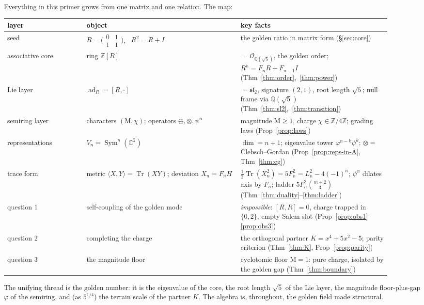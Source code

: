 \documentclass[11pt]{article}
\newcommand{\OK}{𝒪}
\theoremstyle{plain}
\theoremstyle{definition}
\theoremstyle{remark}
\newcommand{\Tr}{\operatorname{Tr}}
\newcommand{\Mah}{\mathrm{M}}
\newcommand{\ad}{\operatorname{ad}}
\begin{document}
Everything in this primer grows from one matrix and one relation. The map:
\begin{center}\small
\renewcommand{\arraystretch}{1.35}
\begin{tabular}{@{}p{0.19\linewidth}p{0.37\linewidth}p{0.36\linewidth}@{}}
\toprule
layer & object & key facts \\
\midrule
seed & $R=\bigl(\begin{smallmatrix}0&1\\1&1\end{smallmatrix}\bigr)$, \ $R^{2}=R+I$ & the golden ratio in matrix form (§\ref{sec:core}) \\
associative core & ring $ℤ[R]$ & $=\OK_{ℚ(\sqrt5)}$, the golden order; $R^{n}=F_nR+F_{n-1}I$ (Thm~\ref{thm:order},~\ref{thm:power}) \\
Lie layer & $\ad_R=[R,\cdot]$ & $=𝔰𝔩_2$, signature $(2,1)$, root length $\sqrt5$; null frame via $ℚ(\sqrt5)$ (Thm~\ref{thm:sl2},~\ref{thm:transition}) \\
semiring layer & characters $(\Mah,χ)$; operators $⊕,⊗,ψ^{n}$ & magnitude $\Mah≥1$, charge $χ∈ℤ/4ℤ$; grading laws (Prop~\ref{prop:laws}) \\
representations & $V_n=\operatorname{Sym}^n(ℂ^2)$ & $\dim=n+1$; eigenvalue tower $φ^{n-k}ψ^k$; $⊗=$ Clebsch--Gordan (Prop~\ref{prop:reps-in-A}, Thm~\ref{thm:cg}) \\
trace form & metric $⟨X,Y⟩=\Tr(XY)$; deviation $X_n=F_nH$ & $\tfrac12\Tr(X_n^{2})=5F_n^{2}=L_n^{2}-4(-1)^{n}$; $ψ^{n}$ dilates axis by $F_n$; ladder $5F_n^{2}\binom{m+2}{3}$ (Thm~\ref{thm:duality}--\ref{thm:ladder}) \\
\midrule
question 1 & self-coupling of the golden mode & \emph{impossible}: $[R,R]=0$, charge trapped in $\{0,2\}$, empty Salem slot (Prop~\ref{prop:obs1}--\ref{prop:obs3}) \\
question 2 & completing the charge & the orthogonal partner $K=x^4+5x^2-5$; parity criterion (Thm~\ref{thm:K}, Prop~\ref{prop:parity}) \\
question 3 & the magnitude floor & cyclotomic floor $\Mah=1$: pure charge, isolated by the golden gap (Thm~\ref{thm:boundary}) \\
\bottomrule
\end{tabular}
\end{center}

\noindent The unifying thread is the golden number: it is the eigenvalue of the core, the root length $\sqrt5$ of the Lie layer, the magnitude floor-plus-gap $φ$ of the semiring, and (as $5^{1/4}$) the terrain scale of the partner $K$. The algebra is, throughout, the golden field made structural.
\end{document}
